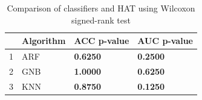 \begin{table}
\footnotesize
\caption{Comparison of classifiers and HAT using Wilcoxon signed-rank test}
\label{tab:wilcoxon comparison}
\begin{tabular}{llll}
\hline
 & Algorithm & ACC p-value & AUC p-value \\
\hline
1 & ARF & \textbf{0.6250} & \textbf{0.2500} \\
2 & GNB & \textbf{1.0000} & \textbf{0.6250} \\
3 & KNN & \textbf{0.8750} & \textbf{0.1250} \\
\hline
\end{tabular}
\end{table}

